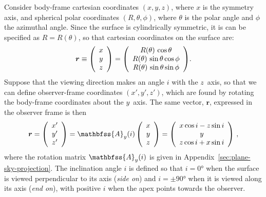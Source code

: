 \documentclass[useAMS, usenatbib, a4paper]{mnras}
\newenvironment{Vector}{\left(\begin{array}{c}}{\end{array}\right)}
\begin{document}
Consider body-frame cartesian coordinates $(x,y,z)$, where \(x\) is
the symmetry axis, and spherical polar coordinates
\((R, \theta, \phi)\), where \(\theta\) is the polar angle and
\(\phi\) the azimuthal angle.  Since the surface is cylindrically
symmetric, it is can be specified as $R = R(\theta)$, so that
cartesian coordinates on the surface are:
\begin{equation}
  \bm{r} \equiv
  \begin{Vector}
    x \\ y \\ z
  \end{Vector} 
  = 
  \begin{Vector}
    R(\theta)\, \cos\theta \\
    R(\theta)\, \sin\theta\cos\phi \\
    R(\theta)\, \sin\theta\sin\phi
  \end{Vector}.
  \label{eq:body-frame}
\end{equation} 
Suppose that the viewing direction makes an angle \(i\) with the
\(z\)~axis, so that we can define observer-frame coordinates
\((x', y', z')\), which are found by rotating the body-frame
coordinates about the \(y\)~axis.  The same vector, \(\bm{r}\), expressed in the observer frame is then 
\begin{equation}
  \bm{r} = 
  \begin{Vector}
    x' \\ y' \\ z'
  \end{Vector}
  = \mathbfss{A}_y(i)\,
  \begin{Vector}
    x \\ y \\ z
  \end{Vector}
  =
  \begin{Vector}
    x\cos i - z\sin i\\
    y \\
    z\cos i + x\sin i
  \end{Vector} \ ,
  \label{eq:Trans}
\end{equation}
where the rotation matrix \(\mathbfss{A}_y(i)\) is given in
Appendix~\ref{sec:plane-sky-projection}.  The inclination angle \(i\)
is defined so that \(i = \ang{0}\) when the surface is viewed
perpendicular to its axis (\textit{side on}) and \(i = \pm\ang{90}\)
when it is viewed along its axis (\textit{end on}), with positive
\(i\) when the apex points towards the observer.
\end{document}
